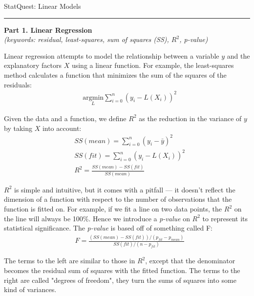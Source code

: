 \documentclass{article}
\begin{document}
\Large StatQuest: Linear Models

\rule{\textwidth}{.2ex}

\large \textbf{Part 1. Linear Regression} \\
\vspace{5mm}
{\it (keywords: residual, least-squares, sum of squares (SS), $R^2$, p-value)}

Linear regression attempts to model the relationship between a variable $y$ and the explanatory factors $X$ using a linear function.  For example, the least-squares method calculates a function that minimizes the sum of the squares of the residuals:
\begin{align}
& \underset{L}{\mathrm{argmin}} \sum_{i=0}^n (y_i - L(X_i))^2
\end{align}

Given the data and a function, we define $R^2$ as the reduction in the variance of $y$ by taking $X$ into account:
\begin{align}
& SS(mean) = \sum_{i = 0}^n (y_i - \bar y)^2 \\
& SS(fit) = \sum_{i=0}^n (y_i - L(X_i))^2 \\
& R^2 = \frac {SS(mean) - SS(fit)} {SS(mean)}
\end{align}

$R^2$ is simple and intuitive, but it comes with a pitfall --- it doesn't reflect the dimension of a function with respect to the number of observations that the function is fitted on.  For example, if we fit a line on two data points, the $R^2$ on the line will always be 100\%.  Hence we introduce a \textit{p-value} on $R^2$ to represent its statistical significance.  The \textit{p-value} is based off of something called F:
\begin{align}
& F = \frac{(SS(mean) - SS(fit)) / (p_{fit} - p_{mean})}{SS(fit) / (n - p_{fit})}
\end{align}

The terms to the left are similar to those in $R^2$, except that the denominator becomes the residual sum of squares with the fitted function.  The terms to the right are called "degrees of freedom", they turn the sums of squares into some kind of variances.
\end{document}
